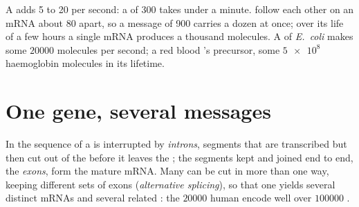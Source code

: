 \begin{example}\label{ex:g11:gene-expression:speed}
A  adds 5 to 20  per second: a  of 300  takes under a minute.  follow each other on an mRNA
about 80  apart, so a message of 900  carries a
dozen at once; over its life of a few hours a single mRNA produces a
thousand  molecules. A  of \emph{E.~coli} makes some
$\num{20000}$  molecules per second; a red blood 's
precursor, some $\num{5e8}$ haemoglobin molecules in its lifetime.
\end{example}

\section{One gene, several messages}

\begin{proposition}\label{prop:g11:gene-expression:splicing}
In  the sequence of a  is interrupted by
\emph{introns}, segments that are transcribed but then
cut out of the  before it leaves the ; the segments kept and
joined end to end, the \emph{exons}, form the mature mRNA. Many 
can be cut in more than one way, keeping different sets of exons
(\emph{alternative splicing}), so that one  yields several
distinct mRNAs and several related : the $\num{20000}$ human
 encode well over $\num{100000}$ .
\end{proposition}
\admitted

